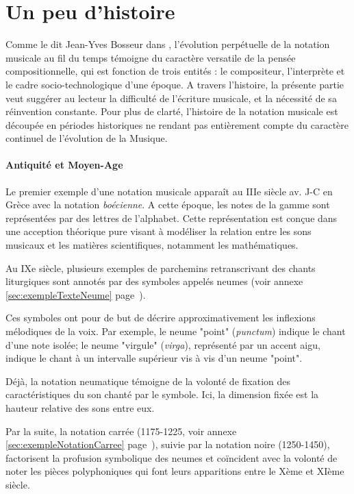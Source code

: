 \section{Un peu d'histoire}
Comme le dit Jean-Yves Bosseur dans \cite{bosseur2005}, l'évolution perpétuelle de la notation musicale au fil du temps témoigne du caractère versatile de la pensée compositionnelle, qui est fonction de trois entités : le compositeur, l'interprète et le cadre socio-technologique d'une époque.
A travers l'histoire, la présente partie veut suggérer au lecteur la difficulté de l'écriture musicale, et la nécessité de sa réinvention constante.
Pour plus de clarté, l'histoire de la notation musicale est découpée en périodes historiques ne rendant pas entièrement compte du caractère continuel de l'évolution de la Musique.   


\paragraph{Antiquité et Moyen-Age} Le premier exemple d'une notation musicale apparaît au IIIe siècle av. J-C en Grèce avec la notation \textit{boécienne}. A cette époque, les notes de la gamme sont représentées par des lettres de l'alphabet.
Cette représentation est conçue dans une acception théorique pure visant à modéliser la relation entre les sons musicaux et les matières scientifiques, notamment les mathématiques.

Au IXe siècle, plusieurs exemples de parchemins retranscrivant des chants liturgiques sont annotés par des symboles appelés \glspl{neume} (voir annexe \ref{sec:exempleTexteNeume} page~\pageref{sec:exempleTexteNeume}). 

Ces symboles ont pour de but de décrire approximativement les inflexions mélodiques de la voix. Par exemple, le neume "point" (\textit{punctum}) indique le chant d'une note isolée; le neume "virgule" (\textit{virga}), représenté par un accent aigu, indique le chant à un intervalle supérieur vis à vis d'un neume "point".

Déjà, la notation neumatique témoigne de la volonté de fixation des caractéristiques du son chanté par le symbole. Ici, la dimension fixée est la hauteur relative des sons entre eux.

Par la suite, la notation carrée (1175-1225, voir annexe \ref{sec:exempleNotationCarree} page~\pageref{sec:exempleNotationCarree}), suivie par la notation noire (1250-1450), factorisent la profusion symbolique des neumes et coïncident avec la volonté de noter les pièces polyphoniques qui font leurs apparitions entre le Xème et XIème siècle.

